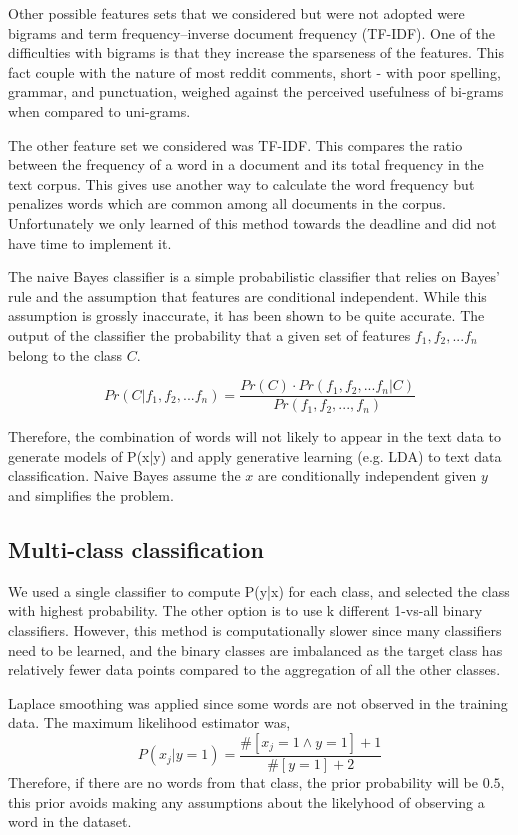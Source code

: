 \documentclass[10pt,twocolumn]{article}
\begin{document}
Other possible features sets that we considered but were not adopted were bigrams and term frequency–inverse document frequency (TF-IDF)\cite{salton1983introduction}. One of the difficulties with bigrams is that they increase the sparseness of the features. This fact couple with the nature of most reddit comments, short - with poor spelling, grammar, and punctuation, weighed against the perceived usefulness of bi-grams when compared to uni-grams.

The other feature set we considered  was TF-IDF. This compares the ratio between the frequency of a word in a document and its total frequency in the text corpus. This gives use another way to calculate the word frequency but penalizes words which are common among all documents in the corpus. Unfortunately we only learned of this method towards the deadline and did not have time to implement it.

The naive Bayes classifier is a simple probabilistic classifier that relies on Bayes' rule and the assumption that features are conditional independent. While this assumption is grossly inaccurate, it has been shown to be quite accurate. The output of the classifier the probability that a given set of features $f_1,f_2,...f_n$ belong to the class $C$. 

\[ Pr(C|f_1,f_2,...f_n) = \frac{Pr(C) \cdot Pr(f_1,f_2,...f_n|C)}{Pr(f_1,f_2,...,f_n)} \]

Therefore, the combination of words will not likely to appear in the text data to generate models of P(x|y) and apply generative learning (e.g. LDA) to text data classification.
Naive Bayes assume the $x$ are conditionally independent given $y$ and simplifies the problem.\autocite{jordan2002discriminative}

\subsection*{Multi-class classification}
We used a single classifier to compute P(y|x) for each class, and selected the class with highest probability.
The other option is to use k different 1-vs-all binary classifiers. However, this method is computationally slower since many classifiers need to be learned, and the binary classes are imbalanced as the target class has relatively fewer data points compared to the aggregation of all the other classes.

Laplace smoothing was applied since some words are not observed in the training data. The maximum likelihood estimator was,
\[
P(x_j|y=1) = \frac {\#[x_j=1 \land y=1]+1}{\#[y=1]+2}
\]
Therefore, if there are no words from that class, the prior probability will be $0.5$, this prior avoids making any assumptions about the likelyhood of observing a word in the dataset.
\end{document}
